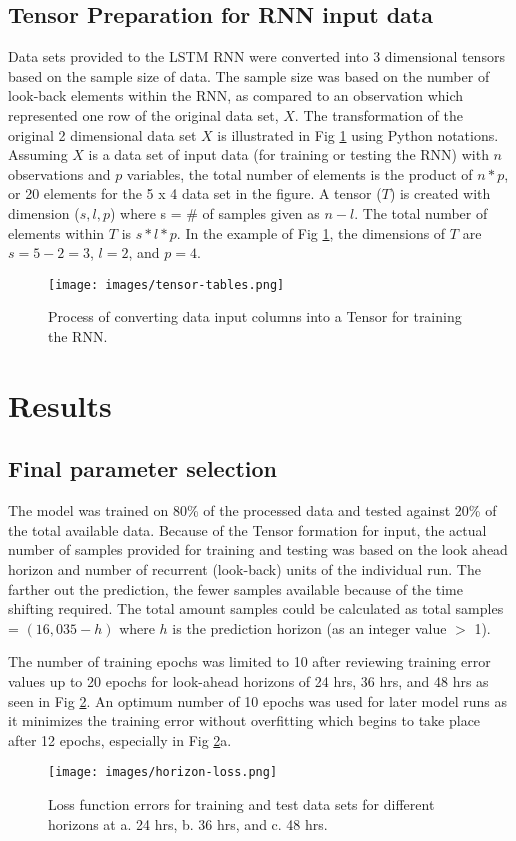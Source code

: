 \documentclass[preprint,12pt,a4paper,authoryear]{elsarticle}
\begin{document}
\begin{linenumbers}
\subsection{Tensor Preparation for RNN input data}
Data sets provided to the LSTM RNN were converted into 3 dimensional tensors based on the sample size of data. The sample size was based on the number of look-back elements within the RNN, as compared to an observation which represented one row of the original data set, $X$.  The transformation of the original 2 dimensional data set $X$ is illustrated in Fig \ref{fig:tensor-tables} using Python notations. Assuming $X$ is a data set of input data (for training or testing the RNN) with $n$ observations and $p$ variables, the total number of elements is the product of $n * p$, or 20 elements for the 5 x 4 data set in the figure. A tensor ($T$) is created with dimension ($s, l, p$) where s = \# of samples given as $n - l$. The total number of elements within $T$ is $s*l*p$. In the example of Fig \ref{fig:tensor-tables}, the dimensions of $T$ are $s = 5 - 2 = 3$, $l = 2$, and $p = 4$.    
%
\begin{figure}[H]
\centering
\texttt{[image: images/tensor-tables.png]}  %
\caption{Process of converting data input columns into a Tensor for training the RNN.}
\label{fig:tensor-tables}
\end{figure}
%

\section{Results}
\subsection{Final parameter selection}
The model was trained on 80\% of the processed data and tested against 20\% of the total available data. Because of the Tensor formation for input, the actual number of samples provided for training and testing was based on the look ahead horizon and number of recurrent (look-back) units of the individual run. The farther out the prediction, the fewer samples available because of the time shifting required. The total amount samples could be calculated as total samples = $(16,035 - h)$ where $h$ is the prediction horizon (as an integer value $>$ 1). 

The number of training epochs was limited to 10 after reviewing training error values up to 20 epochs for look-ahead horizons of 24 hrs, 36 hrs, and 48 hrs as seen in Fig \ref{fig:horizon-loss}. An optimum number of 10 epochs was used for later model runs as it minimizes the training error without overfitting which begins to take place after 12 epochs, especially in Fig \ref{fig:horizon-loss}a. 
%
\begin{figure}[H]
\centering
\texttt{[image: images/horizon-loss.png]}  %
\caption{Loss function errors for training and test data sets for different horizons at a. 24 hrs, b. 36 hrs, and c. 48 hrs.}
\label{fig:horizon-loss}
\end{figure}
%


\end{linenumbers}
\end{document}
